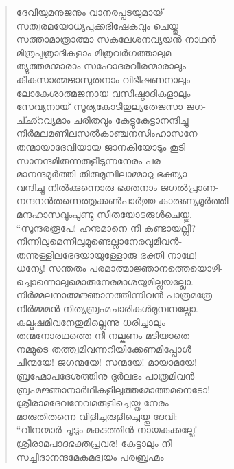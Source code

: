 \begin{verse}
ദേവിയുമനുജനും വാനരപ്പടയുമായ്\\
സത്വരമയോധ്യപുക്കഭിഷേകവും ചെയ്തു\\
സത്താമാത്രാത്മാ സകലേശനവ്യയന്‍ നാഥന്‍\\
മിത്രപുത്രാദികളാം മിത്രവര്‍ഗത്താലുമ-\\
ത്യുത്തമന്മാരാം സഹോദരവീരന്മാരാലും\\
കീകസാത്മജാസുതനാം വിഭീഷണനാലും\\
ലോകേശാത്മജനായ വസിഷ്ഠാദികളാലും\\
സേവ്യനായ് സൂര്യകോടിതുല്യതേജസാ ജഗ-\\
ച്ഛ്റവ്യമാം ചരിതവും കേട്ടുകേട്ടാനന്ദിച്ചു\\
നിര്‍മലമണിലസല്‍കാഞ്ചനസിംഹാസനേ\\
തന്മായാദേവിയായ ജാനകിയോടും കൂടി\\
സാനന്ദമിരുന്നരുളീടുന്നനേരം പര-\\
മാനന്ദമൂര്‍ത്തി തിരുമുമ്പിലാമ്മാറു ഭക്ത്യാ\\
വന്ദിച്ചു നില്‍ക്കുന്നൊരു ഭക്തനാം ജഗല്‍പ്രാണ-\\
നന്ദനന്‍തന്നെത്തൃക്കണ്‍പാര്‍ത്തു കാരുണ്യമൂര്‍ത്തി\\
മന്ദഹാസവുംപൂണ്ടു സീതയോടരുള്‍ചെയ്തു.\\
“സുന്ദരരൂപേ! ഹനുമാനെ നീ കണ്ടായല്ലീ?\\
നിന്നിലുമെന്നിലുമുണ്ടെല്ലാനേരവുമിവന്‍-\\
തന്നുള്ളിലഭേദയായുള്ളോരു ഭക്തി നാഥേ!\\
ധന്യേ! സന്തതം പരമാത്മാജ്ഞാനത്തെയൊഴി-\\
ച്ചൊന്നൊലുമൊരുനേരമാശയുമില്ലയല്ലോ.\\
നിര്‍മ്മലനാത്മജ്ഞാനത്തിന്നിവന്‍ പാത്രമത്രേ\\
നിര്‍മ്മമന്‍ നിത്യബ്രഹ്മചാരികള്‍മുമ്പനല്ലോ.\\
കല്മഷമിവനേതുമില്ലെന്നു ധരിച്ചാലും\\
തന്മനോരഥത്തെ നീ നല്കണം മടിയാതെ\\
നമ്മുടെ തത്ത്വമിവന്നറിയിക്കേണമിപ്പോള്‍\\
ചിന്മയേ! ജഗന്മയേ! സന്മയേ! മായാമയേ!\\
ബ്രഹ്മോപദേശത്തിനു ദുര്‍ലഭം പാത്രമിവന്‍\\
ബ്രഹ്മജ്ഞാനാര്‍ഥികളിലുത്തമോത്തമനെടോ!\\
ശ്രീരാമദേവനേവമരുളിച്ചെയ്ത നേരം\\
മാരുതിതന്നെ വിളിച്ചരുളിച്ചെയ്തു ദേവി:\\
“വീനന്മാര്‍ ചൂടും മകുടത്തിന്‍ നായകക്കല്ലേ!\\
ശ്രീരാമപാദഭക്തപ്രവര! കേട്ടാലും നീ\\
സച്ചിദാനന്ദമേകമദ്വയം പരബ്രഹ്മം\\

\end{verse}
